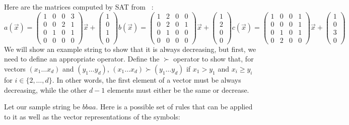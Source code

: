 Here are the matrices computed by SAT from ~\cite{Hofbauer:2006:TA:1142725.1711178}:
\[
a(\Vec{x}) = \begin{pmatrix}
1&0&0&3\\
0&0&2&1\\
0&1&0&1\\
0&0&0&0
\end{pmatrix} \Vec{x} + \begin{pmatrix}
1\\
0\\
1\\
0
\end{pmatrix}
b(\Vec{x}) = \begin{pmatrix}
1&2&0&0\\
0&2&0&1\\
0&1&0&0\\
0&0&0&0
\end{pmatrix} \Vec{x} + \begin{pmatrix}
1\\
2\\
0\\
0
\end{pmatrix}
c(\Vec{x}) = \begin{pmatrix}
1&0&0&1\\
0&0&0&1\\
0&1&0&1\\
0&2&0&0
\end{pmatrix} \Vec{x} + \begin{pmatrix}
1\\
0\\
3\\
0
\end{pmatrix}
\]
We will show an example string to show that it is always decreasing, but first, we need to define an appropriate operator. Define the $\succ$ operator to show that, for vectors $(x_1 \ldots x_d)$ and $(y_1 \ldots y_d)$, $(x_1 \ldots x_d) \succ (y_1 \ldots y_d)$ if $x_1 > y_1$ and $x_i \geq y_i$ for $i \in \{2, \ldots, d\}$. In other words, the first element of a vector must be always decreasing, while the other $d-1$ elements must either be the same or decrease. \par
Let our sample string be $bbaa$. Here is a possible set of rules that can be applied to it as well as the vector representations of the symbols:
